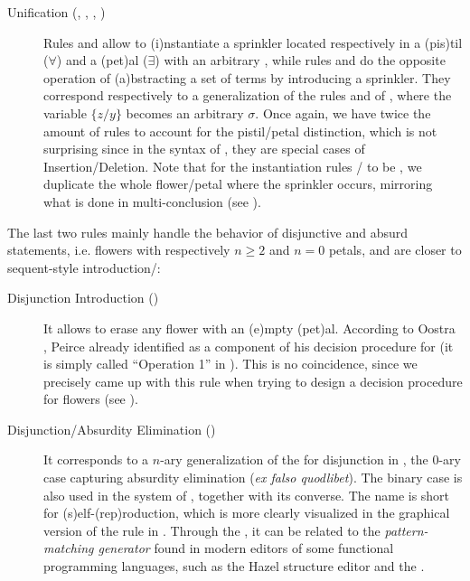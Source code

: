 \begin{scope}
\begin{description}
  \item[Unification (, , , )]
    Rules  and  allow to \textsf{(i)}nstantiate a sprinkler
    located respectively in a \textsf{(pis)}til ($\forall$) and a
    \textsf{(pet)}al ($\exists$) with an arbitrary , while rules
     and  do the opposite operation of
    \textsf{(a)}bstracting a set of terms by introducing a sprinkler. They
    correspond respectively to a generalization of the rules  and
     of , where the variable  $\{z/y\}$
    becomes an arbitrary  $\sigma$. Once again, we have twice the
    amount of rules to account for the pistil/petal distinction, which is not
    surprising since in the  syntax of , they are special cases of
    Insertion/Deletion. Note that for the instantiation rules
    / to be , we duplicate the whole flower/petal
    where the sprinkler occurs, mirroring what is done in multi-conclusion
     (see ).
\end{description}

The last two rules mainly handle the behavior of disjunctive and absurd
statements, i.e. flowers with respectively $n \geq 2$ and $n = 0$ petals, and
are closer to sequent-style introduction/:

\begin{description}
  \item[Disjunction Introduction ()]
    It allows to erase any flower with an \textsf{(e)}mpty \textsf{(pet)}al.
    According to Oostra \cite[p.~109]{oostra_advances_2022}, Peirce already
    identified  as a component of his decision procedure for
     (it is simply called ``Operation 1'' in
    \cite{oostra_advances_2022}). This is no coincidence, since we precisely
    came up with this rule when trying to design a decision procedure for
    flowers (see ).

  \item[Disjunction/Absurdity Elimination ()]
    It corresponds to a $n$-ary generalization of the  for disjunction in , the $0$-ary case capturing
    absurdity elimination (\textit{ex falso quodlibet}). The binary case is also
    used in the  system of \cite{minghui_graphical_2019}, together with
    its converse. The name  is short for
    \textsf{(s)}elf-\textsf{(rep)}roduction, which is more clearly visualized in
    the graphical version of the rule in . Through the
    , it can be related to the \emph{pattern-matching
    generator} found in modern editors of some functional programming languages,
    such as the Hazel structure editor and the  
    .
\end{description}


\end{scope}

